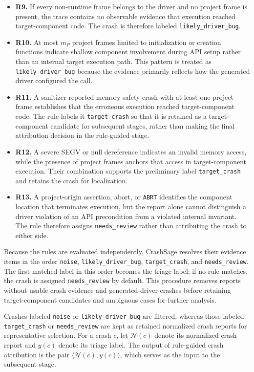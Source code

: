 \documentclass[pdflatex,sn-basic]{sn-jnl}%
\theoremstyle{thmstyleone}%
\theoremstyle{thmstyletwo}%
\theoremstyle{thmstylethree}%
\begin{document}
\begin{itemize}
    \item \textbf{R9.} If every non-runtime frame belongs to the driver and no project frame is present, the trace contains no observable evidence that execution reached target-component code. The crash is therefore labeled \texttt{likely\_driver\_bug}.
    \item \textbf{R10.} At most \(m_P\) project frames limited to initialization or creation functions indicate shallow component involvement during API setup rather than an internal target execution path. This pattern is treated as \texttt{likely\_driver\_bug} because the evidence primarily reflects how the generated driver configured the call.
    \item \textbf{R11.} A sanitizer-reported memory-safety crash with at least one project frame establishes that the erroneous execution reached target-component code. The rule labels it \texttt{target\_crash} so that it is retained as a target-component candidate for subsequent stages, rather than making the final attribution decision in the rule-guided stage.
    \item \textbf{R12.} A severe SEGV or null dereference indicates an invalid memory access, while the presence of project frames anchors that access in target-component execution. Their combination supports the preliminary label \texttt{target\_crash} and retains the crash for localization.
    \item \textbf{R13.} A project-origin assertion, abort, or \texttt{ABRT} identifies the component location that terminates execution, but the report alone cannot distinguish a driver violation of an API precondition from a violated internal invariant. The rule therefore assigns \texttt{needs\_review} rather than attributing the crash to either side.
\end{itemize}

Because the rules are evaluated independently, CrashSage resolves their evidence items in the order \texttt{noise}, \texttt{likely\_driver\_bug}, \texttt{target\_crash}, and \texttt{needs\_review}.
The first matched label in this order becomes the triage label; if no rule matches, the crash is assigned \texttt{needs\_review} by default.
This procedure removes reports without usable crash evidence and generated-driver crashes before retaining target-component candidates and ambiguous cases for further analysis.

Crashes labeled \texttt{noise} or \texttt{likely\_driver\_bug} are filtered, whereas those labeled \texttt{target\_crash} or \texttt{needs\_review} are kept as retained normalized crash reports for representative selection.
For a crash \(c\), let \(\mathcal{N}(c)\) denote its normalized crash report and \(y(c)\) denote its triage label.
The output of rule-guided crash attribution is the pair \(\langle\mathcal{N}(c),y(c)\rangle\), which serves as the input to the subsequent stage.
\end{document}
